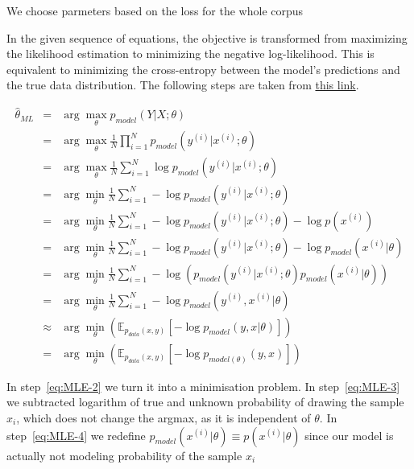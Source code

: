 \documentclass[11pt]{article}
\begin{document}
We choose parmeters based on the loss for the whole corpus

In the given sequence of equations, the objective is transformed from maximizing the likelihood estimation to minimizing the negative log-likelihood. This is equivalent to minimizing the cross-entropy between the model's predictions and the true data distribution. The following steps are taken from \href{https://stats.stackexchange.com/questions/428937/mle-and-cross-entropy-for-conditional-probabilities/477867#477867}{this link}.

\begin{eqnarray} 
    \hat{\theta}_{ML} &=& \arg\max_{\theta} p_{model}(Y|X;\theta) \label{eq:MLE-0} \\
    &=& \arg\max_{\theta} \frac{1}{N} \prod_{i=1}^{N} p_{model}(y^{(i)}|x^{(i)};\theta) \label{eq:MLE-1} \\
    &=& \arg\max_{\theta} \frac{1}{N} \sum_{i=1}^{N} \log p_{model}(y^{(i)}|x^{(i)};\theta) \label{eq:MLE-1} \\
    &=& \arg\min_{\theta} \frac{1}{N} \sum_{i=1}^{N} - \log p_{model}(y^{(i)}|x^{(i)};\theta)  \label{eq:MLE-2} \\
    &=& \arg\min_{\theta} \frac{1}{N} \sum_{i=1}^{N} - \log p_{model}(y^{(i)}|x^{(i)};\theta) - \log p(x^{(i)}) \label{eq:MLE-3} \\
    &=& \arg\min_{\theta} \frac{1}{N} \sum_{i=1}^{N} - \log p_{model}(y^{(i)}|x^{(i)};\theta) - \log p_{model}(x^{(i)}|\theta) \label{eq:MLE-4} \\
    &=& \arg\min_{\theta} \frac{1}{N} \sum_{i=1}^{N} - \log \left( p_{model}(y^{(i)}|x^{(i)};\theta)p_{model}(x^{(i)}|\theta) \right) \label{eq:MLE-5} \\
    &=& \arg\min_{\theta} \frac{1}{N} \sum_{i=1}^{N} - \log  p_{model}(y^{(i)}, x^{(i)}|\theta) \label{eq:MLE-6} \\
    &\approx& \arg\min_{\theta} \left(\mathbb{E}_{p_{data}(x,y)}\left[ -\log p_{model}(y,x|\theta) \right] \right) \label{eq:MLE-7} \\
    &=& \arg\min_{\theta} \left(\mathbb{E}_{p_{data}(x,y)}\left[ -\log p_{model(\theta)}(y,x) \right] \right) \label{eq:MLE-8} 
\end{eqnarray}

In step~\ref{eq:MLE-2} we turn it into a minimisation problem. In step~\ref{eq:MLE-3} we subtracted logarithm of true and unknown probability of drawing the sample $x_i$, which does not change the argmax, as it is independent of $\theta$. In step~\ref{eq:MLE-4} we redefine $p_{model}(x^{(i)}|\theta) \equiv p(x^{(i)}|\theta)$ since our model is actually not modeling probability of the sample $x_i$
\end{document}
